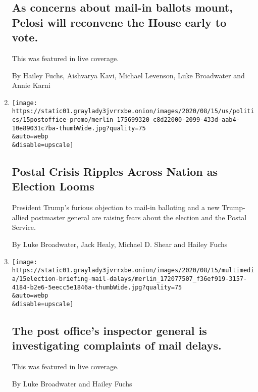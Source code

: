 \begin{enumerate}
  \hypertarget{as-concerns-about-mail-in-ballots-mount-pelosi-will-reconvene-the-house-early-to-vote}{%
  \subsection{As concerns about mail-in ballots mount, Pelosi will
  reconvene the House early to
  vote.}\label{as-concerns-about-mail-in-ballots-mount-pelosi-will-reconvene-the-house-early-to-vote}}

  This was featured in live coverage.

  By Hailey Fuchs, Aishvarya Kavi, Michael Levenson, Luke Broadwater and
  Annie Karni
\item
  \href{/2020/08/15/us/post-office-vote-by-mail.html}{}

  \texttt{[image: https://static01.graylady3jvrrxbe.onion/images/2020/08/15/us/politics/15postoffice-promo/merlin\_175699320\_c8d22000-2099-433d-aab4-10e89031c7ba-thumbWide.jpg?quality=75\\\&auto=webp\\\&disable=upscale]}

  \hypertarget{postal-crisis-ripples-across-nation-as-election-looms}{%
  \subsection{Postal Crisis Ripples Across Nation as Election
  Looms}\label{postal-crisis-ripples-across-nation-as-election-looms}}

  President Trump's furious objection to mail-in balloting and a new
  Trump-allied postmaster general are raising fears about the election
  and the Postal Service.

  By Luke Broadwater, Jack Healy, Michael D. Shear and Hailey Fuchs
\item
  \href{/live/2020/08/15/us/biden-vs-trump-election/the-post-offices-inspector-general-is-investigating-complaints-of-mail-delays}{}

  \texttt{[image: https://static01.graylady3jvrrxbe.onion/images/2020/08/15/multimedia/15election-briefing-mail-dalays/merlin\_172077507\_f36ef919-3157-4184-b2e6-5eecc5e1846a-thumbWide.jpg?quality=75\\\&auto=webp\\\&disable=upscale]}

  \hypertarget{the-post-offices-inspector-general-is-investigating-complaints-of-mail-delays}{%
  \subsection{The post office's inspector general is investigating
  complaints of mail
  delays.}\label{the-post-offices-inspector-general-is-investigating-complaints-of-mail-delays}}

  This was featured in live coverage.

  By Luke Broadwater and Hailey Fuchs
\end{enumerate}

